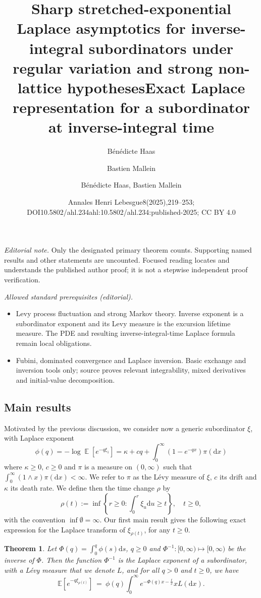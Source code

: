 \documentclass[10pt]{amsart}
\title[Sharp inverse-integral subordinator asymptotics]{Sharp stretched-exponential Laplace asymptotics for inverse-integral subordinators under regular variation and strong non-lattice hypotheses}
\author{B\'en\'edicte Haas}
\author{Bastien Mallein}
\date{Annales Henri Lebesgue8(2025),219–253; DOI10.5802/ahl.234}
\title{Exact Laplace representation for a subordinator at inverse-integral time}
\author{Bénédicte Haas, Bastien Mallein}
\date{ahl:10.5802/ahl.234:published-2025; CC BY 4.0}
\newtheorem{theo}{Theorem}[section]
\theoremstyle{definition}
\numberwithin{equation}{section}
\newcommand{\bbE}{\mathbb{E}}
\DeclareMathOperator{\E}{\mathbb{E}}
\newcommand{\dd}{\mathrm{d}}
\begin{document}
\maketitle
\noindent\textit{Editorial note.} Only the designated primary theorem counts. Supporting named results and other statements are uncounted. Focused reading locates and understands the published author proof; it is not a stepwise independent proof verification.\par\medskip
\noindent\textit{Allowed standard prerequisites (editorial).}\begin{itemize}
\item Levy process fluctuation and strong Markov theory. Inverse exponent is a subordinator exponent and its Levy measure is the excursion lifetime measure. The PDE and resulting inverse-integral-time Laplace formula remain local obligations.
\item Fubini, dominated convergence and Laplace inversion. Basic exchange and inversion tools only; source proves relevant integrability, mixed derivatives and initial-value decomposition.
\end{itemize}\medskip
\subsection{Main results}\label{sec:def_fragmentations}

Motivated by the previous discussion, we consider now a generic subordinator $\xi$, with Laplace exponent
\[
\phi(q)=-\log \E\left[e^{-q \xi_1}\right] = \kappa + c q + \int_0^\infty (1 - e^{-qx}) \pi(\dd x)
\]
where $\kappa \geq 0$, $c \geq 0$ and $\pi$ is a measure on $(0,\infty)$ such that $\int_0^{\infty} (1 \wedge x) \pi(\dd x) < \infty$. We refer to $\pi$ as the Lévy measure of $\xi$, $c$ its drift and $\kappa$ its death rate. We define then the time change $\rho$ by
\[
\rho(t) := \inf \left\{ r \geq 0 : \int_0^r \xi_u \dd u \geq t \right\}, \quad t \geq 0,
\]
with the convention $\inf{\emptyset}=\infty$. Our first main result gives the following exact expression for the Laplace transform of $\xi_{\rho(t)}$, for any $t\geq 0$.



\begin{theo}\label{thm:lapTransform}
Let $\Phi(q)=\int_0^q \phi(s) \dd s$, $q \geq 0$ and $\Phi^{-1}: [0,\infty) \mapsto [0,\infty)$ be the inverse of $\Phi$. Then the function $\Phi^{-1}$ is the Laplace exponent of a subordinator, with a Lévy measure that we denote $L$, and for all $q > 0$ and $t \geq 0$, we have
\begin{equation}\label{eq:Laplace_intro}
\bbE\left[e^{-q\xi_{\rho(t)}}\right]~=~\phi(q)\int_0^{\infty} e^{-\Phi(q)x-\frac{t}{x}} xL(\dd x).
\end{equation}
\end{theo}
\end{document}
